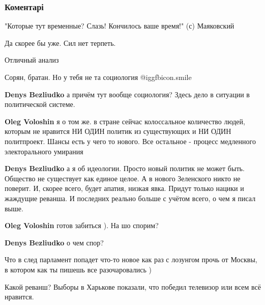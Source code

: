  
 
 
 
 
\subsubsection{Коментарі}

\begin{itemize} %
"Которые тут временные? Слазь! Кончилось ваше время!" (с) Маяковский

Да скорее бы уже. Сил нет терпеть.

Отличный анализ

Сорян, братан. Но у тебя не та социология  @igg{fbicon.smile} 

\begin{itemize} %
\textbf{Denys Bezliudko} а причём тут вообще социология? Здесь дело в ситуации в политической системе.

\textbf{Oleg Voloshin} я о том же. в стране сейчас колоссальное количество людей, которым не нравится НИ ОДИН политик из существующих и НИ ОДИН политпроект. Шансы есть у чего то нового. Все остальное - процесс медленного электорального умирания

\textbf{Denys Bezliudko} а я об идеологии. Просто новый политик не может быть. Общество не существует как единое целое. А в нового Зеленского никто не поверит. И, скорее всего, будет апатия, низкая явка. Придут только нацики и жаждущие реванша. И последних реально больше с учётом всего, о чем я писал выше.

\textbf{Oleg Voloshin} готов забиться ). На шо спорим?

\textbf{Denys Bezliudko} о чем спор?

Что в след парламент попадет что-то новое как раз с лозунгом прочь от Москвы, в котором как ты пишешь все разочаровались )
\end{itemize} %

Какой реванш? Выборы в Харькове показали, что победил телевизор или всем всё нравится.


\end{itemize}
